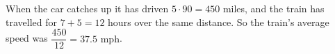 When the car catches up it has driven $5\cdot90=450$ miles, and the train has travelled for $7+5=12$ hours over the same distance. So the train's average speed was $\dfrac{450}{12}=\boxed{37.5\text{ mph}}$.
